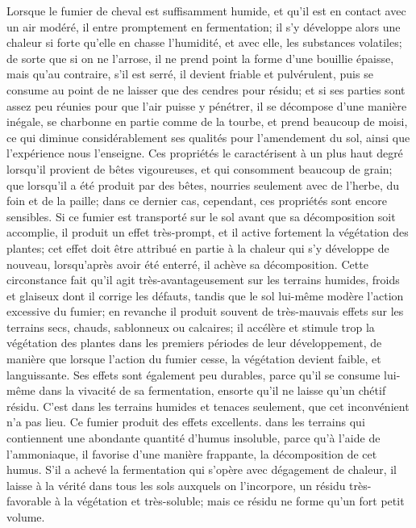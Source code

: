 Lorsque le fumier de cheval est suffisamment humide, et qu’il est en contact avec un air modéré, il entre promptement en fermentation; il s’y développe alors une chaleur si forte qu’elle en chasse l’humidité, et avec elle, les substances volatiles; de sorte que si on ne l’arrose, il ne prend point la forme d’une bouillie épaisse, mais qu’au contraire, s’il est serré, il devient friable et pulvérulent, puis se consume au point de ne laisser que des cendres pour résidu; et si ses parties sont assez peu réunies pour que l’air puisse y pénétrer, il se décompose d’une manière inégale, se charbonne en partie comme de la tourbe, et prend beaucoup de moisi, ce qui diminue considérablement ses qualités pour l’amendement du sol, ainsi que l’expérience nous l’enseigne. Ces propriétés le caractérisent à un plus haut degré lorsqu’il provient de bêtes vigoureuses, et qui consomment beaucoup de grain; que\setcounter{page}{235} lorsqu'il a été produit par des bêtes, nourries seulement avec de l'herbe, du foin et de la paille; dans ce dernier cas, cependant, ces propriétés sont encore sensibles. Si ce fumier est transporté sur le sol avant que sa décomposition soit accomplie, il produit un effet très-prompt, et il active fortement la végétation des plantes; cet effet doit être attribué en partie à la chaleur qui s'y développe de nouveau, lorsqu'après avoir été enterré, il achève sa décomposition. Cette circonstance fait qu'il agit très-avantageusement sur les terrains humides, froids et glaiseux dont il corrige les défauts, tandis que le sol lui-même modère l'action excessive du fumier; en revanche il produit souvent de très-mauvais effets sur les terrains secs, chauds, sablonneux ou calcaires; il accélère et stimule trop la végétation des plantes dans les premiers périodes de leur développement, de manière que lorsque l'action du fumier cesse, la végétation devient faible, et languissante. Ses effets sont également peu durables, parce qu'il se consume lui-même dans la vivacité de sa fermentation, ensorte qu'il ne laisse qu'un chétif résidu. C'est dans les terrains humides et tenaces seulement, que cet inconvénient n'a pas lieu. Ce fumier produit des effets excellents.\setcounter{page}{236} dans les terrains qui contiennent une abondante quantité d'humus insoluble, parce qu'à l'aide de l'ammoniaque, il favorise d'une manière frappante, la décomposition de cet humus. S'il a achevé la fermentation qui s'opère avec dégagement de chaleur, il laisse à la vérité dans tous les sols auxquels on l'incorpore, un résidu très-favorable à la végétation et très-soluble; mais ce résidu ne forme qu'un fort petit volume.
